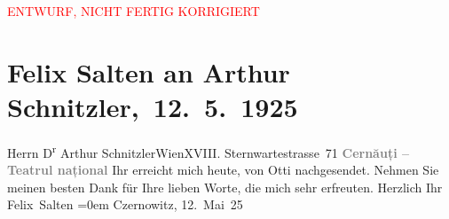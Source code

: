 
\begin{center}
            \textcolor{red}{ENTWURF, NICHT FERTIG KORRIGIERT}
                      \end{center}
            
         
         \renewcommand{\erwaehntePersonen}{Personen: Ottilie Salten}
         \renewcommand{\erwaehnteOrte}{Orte: Czernowitz, Olha-Kobyljanska-Stadttheater, Sternwartestraße 71, Wien}
         \renewcommand{\erwaehnteWerke}{}
               \section[ Felix Salten an Arthur Schnitzler, 12. 5. 1925]{ Felix Salten an Arthur Schnitzler, 12. 5. 1925}\nopagebreak{}\rehead{ }\begin{ledgroupsized}[t]{13cm}\normalsize\beginnumbering \toendnotes[C]{\smallbreak\pagebreak[2]} 
\toendnotes[C]{\smallbreak}\pstart{}{\pb}Herrn D\textsuperscript{r} Arthur Schnitzler\pend{}\pstart{}Wien\pend{}\pstart{}XVIII. Sternwartestrasse 71\pend{}{\bigskip}\pstart
           \noindent{}\centering{}{\pb}\textcolor{gray}{\textbf{Cernăuți – Teatrul național}}\pend
           \pstart
           {\pb}Ihr \label{K_L03584-1v}\label{K_L03584-1h} erreicht mich heute, von Otti nachgesendet. Nehmen Sie meinen besten Dank für Ihre
               lieben Worte, die mich sehr erfreuten.\pend
           \pstart
           Herzlich Ihr {\\[\baselineskip]}\spacefill\mbox{Felix Salten}\pend
           \leftskip=0em{}\pstart
           Czernowitz, 12. Mai 25\pend
           
         
         \endnumbering{}\end{ledgroupsized}  \newcommand{\dateiname}{L03584}\newcommand{\titel}{Felix Salten an Arthur Schnitzler, 12. 5. 1925}\newcommand{\editorInnen}{Martin Anton Müller und Laura Untner}
      